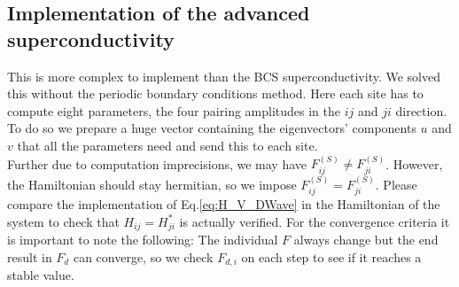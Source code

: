 \documentclass[../main.tex]{subfile}
\begin{document}
\subsection{Implementation of the advanced superconductivity}
This is more complex to implement than the BCS superconductivity. We solved this without the periodic boundary conditions method.
Here each site has to compute eight parameters, the four pairing amplitudes in the $ij$ and $ji$ direction.
To do so we prepare a huge vector containing the eigenvectors' components $u$ and $v$ that all the parameters need and send this to each site.\\
Further due to computation imprecisions, we may have $F^{(S)}_{ij} \neq F^{(S)}_{ji}$. However, the Hamiltonian
should stay hermitian, so we impose $F^{(S)}_{ij} = F^{(S)}_{ji}$. Please compare the implementation of Eq.\ref{eq:H_V_DWave} in 
the Hamiltonian of the system to check that $H_{ij} = H_{ji}^{\ast}$ is
actually verified. For the convergence criteria it is important to note the following:
The individual $F$ always change but the end result in $F_d$ can converge, so we check $F_{d,i}$ on each step to see if it reaches a stable value.\\
\end{document}

